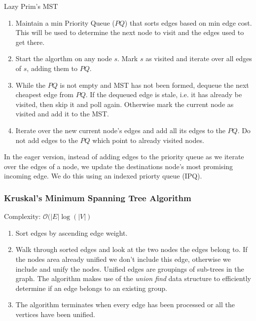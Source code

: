 \documentclass{article}
\newcommand{\bigO}{\mathcal{O}}
\begin{document}
    Lazy Prim's MST
    \begin{enumerate}
        \item Maintain a min Priority Queue ($PQ$) that sorts edges based on min edge cost. This will be used to determine the next node to visit and the edges used to get there.
        
        \item Start the algorthm on any node $s$. Mark $s$ as visited and iterate over all edges of $s$, adding them to $PQ$.
        
        \item While the $PQ$ is not empty and MST has not been formed, dequeue the next cheapest edge from $PQ$. If the dequeued edge is stale, i.e. it has already be visited, then skip it and poll again. Otherwise mark the current node as visited and add it to the MST.
        
        \item Iterate over the new current node's edges and add all its edges to the $PQ$. Do not add edges to the $PQ$ which point to already visited nodes.
    \end{enumerate}
    
    In the eager version, instead of adding edges to the priority queue as we iterate over the edges of a node, we update the destinations node's most promising incoming edge. We do this using an indexed priorty queue (IPQ).
    
    
    \subsubsection{Kruskal's Minimum Spanning Tree Algorithm}
     Complexity: $\bigO(|E|\log(|V|)$
     
    \begin{enumerate}
        \item Sort edges by ascending edge weight.
        \item Walk through sorted edges and look at the two nodes the edges belong to. If the nodes area already unified we don't include this edge, otherwise we include and unify the nodes. Unified edges are groupings of sub-trees in the graph. The algorithm makes use of the \textit{union find} data structure to efficiently determine if an edge belongs to an existing group.
        \item The algorithm terminates when every edge has been processed or all the vertices have been unified.
    \end{enumerate}
    
\end{document}
